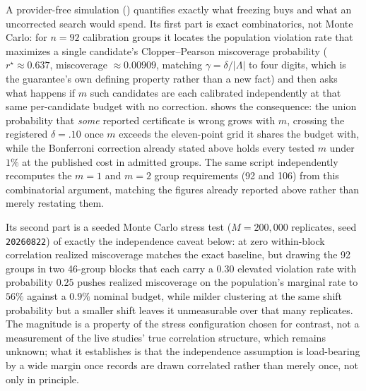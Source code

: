 A provider-free simulation
() quantifies exactly what
freezing buys and what an uncorrected search would spend.  Its first part is
exact combinatorics, not Monte Carlo: for $n=92$ calibration groups it locates the
population violation rate that maximizes a single candidate's Clopper--Pearson
miscoverage probability ($r^\star\approx0.637$, miscoverage $\approx0.00909$, matching
$\gamma=\delta/|\Lambda|$ to four digits, which is the guarantee's own defining property
rather than a new fact) and then asks what happens if $m$ such candidates are each
calibrated independently at that same per-candidate budget with no correction.
 shows the consequence: the union probability that
\emph{some} reported certificate is wrong grows with $m$, crossing the registered
$\delta=.10$ once $m$ exceeds the eleven-point grid it shares the budget with, while the
Bonferroni correction already stated above holds every tested $m$ under $1\%$ at the
published cost in admitted groups.  The same script independently recomputes the $m=1$
and $m=2$ group requirements (92 and 106) from this combinatorial argument, matching the
figures already reported above rather than merely restating them.

\begin{table}[t]
  \centering
  \caption{Exact miscoverage under an uncorrected versus Bonferroni-corrected
  $m$-candidate search, at the population rate $r^\star\approx0.637$ that maximizes a
  single candidate's Clopper--Pearson miscoverage at $n=92$.  ``Groups required'' is the
  zero-violation admission count the correction demands at that $m$.}
  \label{tab:frozen-simulation}
  \small
  \resizebox{0.7\textwidth}{!}{}
\end{table}

Its second part is a seeded Monte
Carlo stress test ($M=200{,}000$ replicates, seed \texttt{20260822}) of exactly the
independence caveat below: at zero within-block correlation realized miscoverage matches
the exact baseline, but drawing the 92 groups in two 46-group blocks that each carry a
$0.30$ elevated violation rate with probability $0.25$ pushes realized miscoverage on the
population's marginal rate to $56\%$ against a $0.9\%$ nominal budget, while milder
clustering at the same shift probability but a smaller shift leaves it unmeasurable over
that many replicates.  The magnitude is a property of the stress configuration chosen for
contrast, not a measurement of the live studies' true correlation structure, which remains
unknown; what it establishes is that the independence assumption is load-bearing by a wide
margin once records are drawn correlated rather than merely once, not only in principle.

